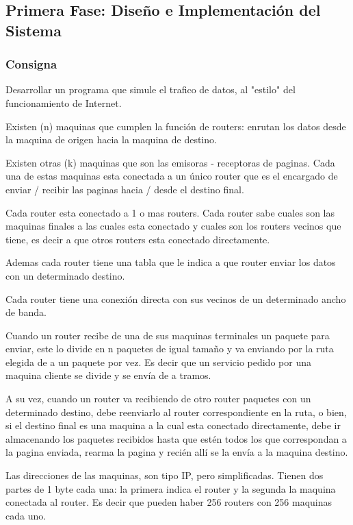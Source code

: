 \documentclass[12pt]{article} %
\begin{document}
\subsection{Primera Fase: Diseño e Implementación del Sistema} %

\subsubsection{Consigna}

Desarrollar un programa que simule el trafico de datos, al "estilo" del funcionamiento de Internet.

Existen (n) maquinas que cumplen la función de routers: enrutan los datos desde la maquina de origen hacia la maquina de destino.

Existen otras (k) maquinas que son las emisoras - receptoras de paginas. Cada una de estas maquinas esta conectada a un único router que es el encargado de enviar / recibir las paginas hacia / desde el destino final.

Cada router esta conectado a 1 o mas routers. Cada router sabe cuales son las maquinas finales a las cuales esta conectado y cuales son los routers vecinos que tiene, es decir a que otros routers esta conectado directamente.

Ademas cada router tiene una tabla que le indica a que router enviar los datos con un determinado destino.

Cada router tiene una conexión directa con sus vecinos de un determinado ancho de banda.

Cuando un router recibe de una de sus maquinas terminales un paquete para enviar, este lo divide en n paquetes de igual tamaño y va enviando por la ruta elegida de a un paquete por vez. Es decir que un servicio pedido por una maquina cliente se divide y se envía de a tramos.

A su vez, cuando un router va recibiendo de otro router paquetes con un determinado destino, debe reenviarlo al router correspondiente en la ruta, o bien, si el destino final es una maquina a la cual esta conectado directamente, debe ir almacenando los paquetes recibidos hasta que estén todos los que correspondan a la pagina enviada, rearma la pagina y recién allí se la envía a la maquina destino.

Las direcciones de las maquinas, son tipo IP, pero simplificadas. Tienen dos partes de 1 byte cada una: la primera indica el router y la segunda la maquina conectada al router. Es decir que pueden haber 256 routers con 256 maquinas cada uno.
\end{document}
